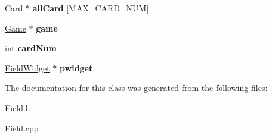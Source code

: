 \begin{DoxyCompactItemize}
\hyperlink{class_card}{Card} $\ast$ {\bfseries all\+Card} \mbox{[}M\+A\+X\+\_\+\+C\+A\+R\+D\+\_\+\+N\+UM\mbox{]}
\item 
\mbox{\label{class_field_a6c884f5f7251cff1ded52697260ecc59}} 
\hyperlink{class_game}{Game} $\ast$ {\bfseries game}
\item 
\mbox{\label{class_field_ae84e6dbea75306aa3485a5af41481a02}} 
int {\bfseries card\+Num}
\item 
\mbox{\label{class_field_ae4ff47a6621b127097831f32825150fb}} 
\hyperlink{class_field_widget}{Field\+Widget} $\ast$ {\bfseries pwidget}
\end{DoxyCompactItemize}


The documentation for this class was generated from the following files\+:\begin{DoxyCompactItemize}
\item 
Field.\+h\item 
Field.\+cpp\end{DoxyCompactItemize}
